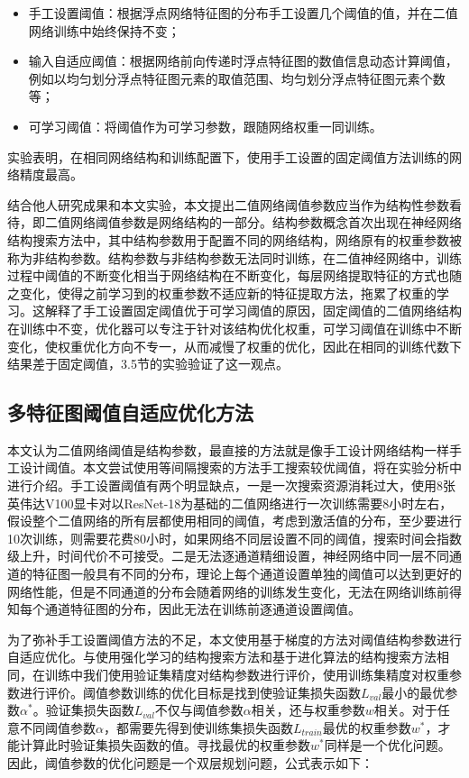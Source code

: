 \begin{itemize}
  \item 手工设置阈值：根据浮点网络特征图的分布手工设置几个阈值的值，并在二值网络训练中始终保持不变；
  \item 输入自适应阈值：根据网络前向传递时浮点特征图的数值信息动态计算阈值，例如以均匀划分浮点特征图元素的取值范围、均匀划分浮点特征图元素个数等；
  \item 可学习阈值：将阈值作为可学习参数，跟随网络权重一同训练。
\end{itemize}
实验表明，在相同网络结构和训练配置下，使用手工设置的固定阈值方法训练的网络精度最高。

结合他人研究成果和本文实验，本文提出二值网络阈值参数应当作为结构性参数看待，即二值网络阈值参数是网络结构的一部分。结构参数概念首次出现在神经网络结构搜索方法\cite{zoph2017neural}中，其中结构参数用于配置不同的网络结构，网络原有的权重参数被称为非结构参数。结构参数与非结构参数无法同时训练，在二值神经网络中，训练过程中阈值的不断变化相当于网络结构在不断变化，每层网络提取特征的方式也随之变化，使得之前学习到的权重参数不适应新的特征提取方法，拖累了权重的学习。这解释了手工设置固定阈值优于可学习阈值的原因，固定阈值的二值网络结构在训练中不变，优化器可以专注于针对该结构优化权重，可学习阈值在训练中不断变化，使权重优化方向不专一，从而减慢了权重的优化，因此在相同的训练代数下结果差于固定阈值，3.5节的实验验证了这一观点。

\subsection{多特征图阈值自适应优化方法}

本文认为二值网络阈值是结构参数，最直接的方法就是像手工设计网络结构一样手工设计阈值。本文尝试使用等间隔搜索的方法手工搜索较优阈值，将在实验分析中进行介绍。手工设置阈值有两个明显缺点，一是一次搜索资源消耗过大，使用8张英伟达V100显卡对以ResNet-18为基础的二值网络进行一次训练需要8小时左右，假设整个二值网络的所有层都使用相同的阈值，考虑到激活值的分布，至少要进行10次训练，则需要花费80小时，如果网络不同层设置不同的阈值，搜索时间会指数级上升，时间代价不可接受。二是无法逐通道精细设置，神经网络中同一层不同通道的特征图一般具有不同的分布，理论上每个通道设置单独的阈值可以达到更好的网络性能，但是不同通道的分布会随着网络的训练发生变化，无法在网络训练前得知每个通道特征图的分布，因此无法在训练前逐通道设置阈值。

为了弥补手工设置阈值方法的不足，本文使用基于梯度的方法对阈值结构参数进行自适应优化。与使用强化学习的结构搜索方法\cite{zoph2017neural,zoph2018learning,pham2018efficient}和基于进化算法的结构搜索方法\cite{liu2018hierarchical,real2019regularized}相同，在训练中我们使用验证集精度对结构参数进行评价，使用训练集精度对权重参数进行评价。阈值参数训练的优化目标是找到使验证集损失函数$L_{val}$最小的最优参数$\alpha^*$。验证集损失函数$L_{val}$不仅与阈值参数$\alpha$相关，还与权重参数$w$相关。对于任意不同阈值参数$\alpha$，都需要先得到使训练集损失函数$L_{train}$最优的权重参数$w^*$，才能计算此时验证集损失函数的值。寻找最优的权重参数$w^*$同样是一个优化问题。因此，阈值参数的优化问题是一个双层规划问题，公式表示如下：

